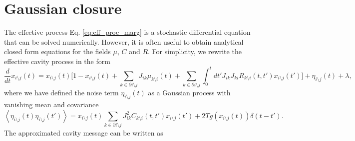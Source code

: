 \documentclass[
    preprint,
    linenumbers,
    amsmath,amssymb,amsfonts,
    aps, physrev,
    superscriptaddress,
    10pt,
    bibnotes
    ]{revtex4-2}
\begin{document}
\section{Gaussian closure}
The effective process Eq. \eqref{eq:eff_proc_marg} is a stochastic differential equation that can be solved numerically. However, it is often useful to obtain analytical closed form equations for the fields $\mu$, $C$ and $R$. 
For simplicity, we rewrite the effective cavity process in the form
\begin{equation}
  \frac{d}{dt}x_{i\setminus j}(t) = x_{i\setminus j}(t)\Biggl[1-x_{i\setminus j}(t)+\sum_{k\in\partial i\setminus j}J_{ik}\mu_{k\setminus i}(t) + \sum_{k\in\partial i\setminus j}\int_{0}^{t}dt'J_{ik}J_{ki}R_{k\setminus i}(t,t')x_{i\setminus j}(t')\Biggr] + \eta_{i\setminus j}(t)+\lambda,
\end{equation}
where we have defined the noise term $\eta_{i\setminus j}(t)$ as a Gaussian process with vanishing mean and covariance
\begin{equation}
  \left\langle \eta_{i\setminus j}(t)\eta_{i\setminus j}(t')\right\rangle = x_{i\setminus j}(t)\sum_{k\in\partial i\setminus j}J_{ik}^{2}C_{k\setminus i}(t,t')x_{i\setminus j}(t') + 2Tg(x_{i\setminus j}(t))\delta(t-t').
\end{equation}
The approximated cavity message can be written as
\end{document}
